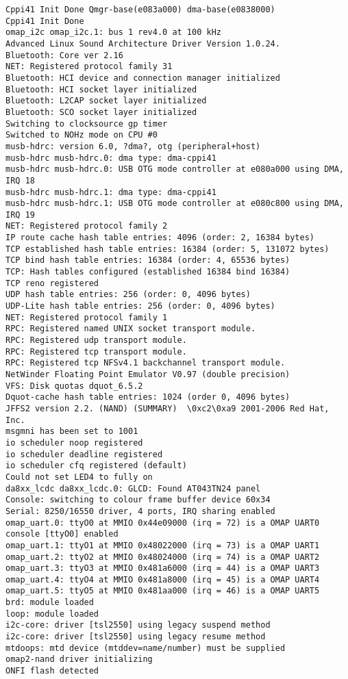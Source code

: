\documentclass[a4paper,12pt]{report}
\begin{document}
\begin{lstlisting}[caption=Messages de sortie du terminal entre l'allumage de la cible et le prompt de login, label=message_sortie]
Cppi41 Init Done Qmgr-base(e083a000) dma-base(e0838000)
Cppi41 Init Done
omap_i2c omap_i2c.1: bus 1 rev4.0 at 100 kHz
Advanced Linux Sound Architecture Driver Version 1.0.24.
Bluetooth: Core ver 2.16
NET: Registered protocol family 31
Bluetooth: HCI device and connection manager initialized
Bluetooth: HCI socket layer initialized
Bluetooth: L2CAP socket layer initialized
Bluetooth: SCO socket layer initialized
Switching to clocksource gp timer
Switched to NOHz mode on CPU #0
musb-hdrc: version 6.0, ?dma?, otg (peripheral+host)
musb-hdrc musb-hdrc.0: dma type: dma-cppi41
musb-hdrc musb-hdrc.0: USB OTG mode controller at e080a000 using DMA, IRQ 18
musb-hdrc musb-hdrc.1: dma type: dma-cppi41
musb-hdrc musb-hdrc.1: USB OTG mode controller at e080c800 using DMA, IRQ 19
NET: Registered protocol family 2
IP route cache hash table entries: 4096 (order: 2, 16384 bytes)
TCP established hash table entries: 16384 (order: 5, 131072 bytes)
TCP bind hash table entries: 16384 (order: 4, 65536 bytes)
TCP: Hash tables configured (established 16384 bind 16384)
TCP reno registered
UDP hash table entries: 256 (order: 0, 4096 bytes)
UDP-Lite hash table entries: 256 (order: 0, 4096 bytes)
NET: Registered protocol family 1
RPC: Registered named UNIX socket transport module.
RPC: Registered udp transport module.
RPC: Registered tcp transport module.
RPC: Registered tcp NFSv4.1 backchannel transport module.
NetWinder Floating Point Emulator V0.97 (double precision)
VFS: Disk quotas dquot_6.5.2
Dquot-cache hash table entries: 1024 (order 0, 4096 bytes)
JFFS2 version 2.2. (NAND) (SUMMARY)  \0xc2\0xa9 2001-2006 Red Hat, Inc.
msgmni has been set to 1001
io scheduler noop registered
io scheduler deadline registered
io scheduler cfq registered (default)
Could not set LED4 to fully on
da8xx_lcdc da8xx_lcdc.0: GLCD: Found AT043TN24 panel
Console: switching to colour frame buffer device 60x34
Serial: 8250/16550 driver, 4 ports, IRQ sharing enabled
omap_uart.0: ttyO0 at MMIO 0x44e09000 (irq = 72) is a OMAP UART0
console [ttyO0] enabled
omap_uart.1: ttyO1 at MMIO 0x48022000 (irq = 73) is a OMAP UART1
omap_uart.2: ttyO2 at MMIO 0x48024000 (irq = 74) is a OMAP UART2
omap_uart.3: ttyO3 at MMIO 0x481a6000 (irq = 44) is a OMAP UART3
omap_uart.4: ttyO4 at MMIO 0x481a8000 (irq = 45) is a OMAP UART4
omap_uart.5: ttyO5 at MMIO 0x481aa000 (irq = 46) is a OMAP UART5
brd: module loaded
loop: module loaded
i2c-core: driver [tsl2550] using legacy suspend method
i2c-core: driver [tsl2550] using legacy resume method
mtdoops: mtd device (mtddev=name/number) must be supplied
omap2-nand driver initializing
ONFI flash detected

\end{lstlisting}
\end{document}
